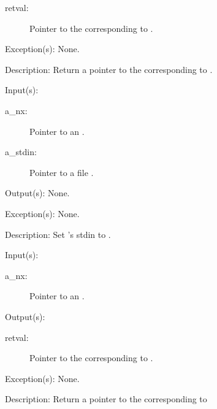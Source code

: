 \begin{capi}
\begin{capilist}
		\begin{description}\item[]
		\item[retval: ]
			Pointer to the  corresponding to
			.
		\end{description}
	\item[Exception(s): ] None.
	\item[Description: ]
		Return a pointer to the  corresponding to
		.
	\end{capilist}
\label{nx_stdin_set}
	\begin{capilist}
	\item[Input(s): ]
		\begin{description}\item[]
		\item[a\_nx: ]
			Pointer to an .
		\item[a\_stdin: ]
			Pointer to a file .
		\end{description}
	\item[Output(s): ] None.
	\item[Exception(s): ] None.
	\item[Description: ]
		Set 's stdin to .
	\end{capilist}
\label{nx_stdout_get}
	\begin{capilist}
	\item[Input(s): ]
		\begin{description}\item[]
		\item[a\_nx: ]
			Pointer to an \classname{nx}.
		\end{description}
	\item[Output(s): ]
		\begin{description}\item[]
		\item[retval: ]
			Pointer to the  corresponding to
			\onyxop{stdout}{}.
		\end{description}
	\item[Exception(s): ] None.
	\item[Description: ]
		Return a pointer to the  corresponding to

\end{capilist}
\end{capi}
